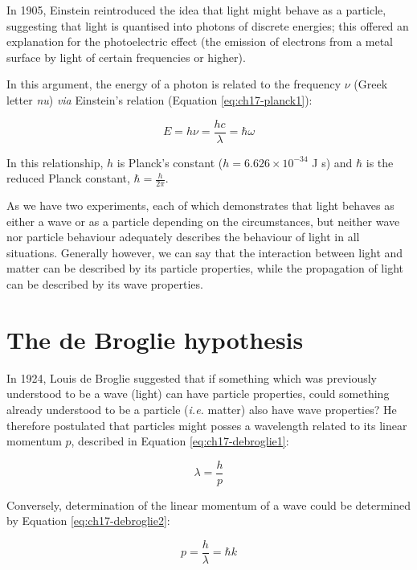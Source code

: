 \documentclass[
]{book}
\begin{document}
In 1905, Einstein reintroduced the idea that light might behave as a particle, suggesting that light is quantised into photons of discrete energies; this offered an explanation for the photoelectric effect (the emission of electrons from a metal surface by light of certain frequencies or higher).

In this argument, the energy of a photon is related to the frequency \(\nu\) (Greek letter \emph{nu}) \emph{via} Einstein's relation (Equation \eqref{eq:ch17-planck1}):

\begin{equation}
E = h \nu = \frac{hc}{\lambda} = \hbar \omega
\label{eq:ch17-planck1}
\end{equation}

In this relationship, \(h\) is Planck's constant (\(h = 6.626 \times 10^{-34}\) J s) and \(\hbar\) is the reduced Planck constant, \(\hbar = \frac{h}{2\pi}\).

As we have two experiments, each of which demonstrates that light behaves as either a wave or as a particle depending on the circumstances, but neither wave nor particle behaviour adequately describes the behaviour of light in all situations. Generally however, we can say that the interaction between light and matter can be described by its particle properties, while the propagation of light can be described by its wave properties.

\hypertarget{sec-ch17-debrogliehyp1}{%
\section{The de Broglie hypothesis}\label{sec-ch17-debrogliehyp1}}

In 1924, Louis de Broglie suggested that if something which was previously understood to be a wave (light) can have particle properties, could something already understood to be a particle (\emph{i.e.} matter) also have wave properties? He therefore postulated that particles might posses a wavelength related to its linear momentum \(p\), described in Equation \eqref{eq:ch17-debroglie1}:

\begin{equation}
\lambda = \frac{h}{p}
\label{eq:ch17-debroglie1}
\end{equation}

Conversely, determination of the linear momentum of a wave could be determined by Equation \eqref{eq:ch17-debroglie2}:

\begin{equation}
p = \frac{h}{\lambda} = \hbar k
\label{eq:ch17-debroglie2}
\end{equation}
\end{document}
